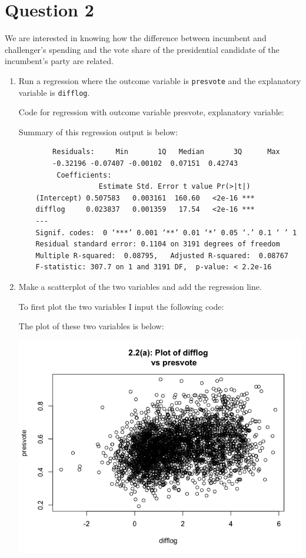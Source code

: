 \documentclass[12pt,letterpaper]{article}
\begin{document}
\newpage

\section*{Question 2}
\noindent We are interested in knowing how the difference between incumbent and challenger's spending and the vote share of the presidential candidate of the incumbent's party are related.	\vspace{.25cm}
	\begin{enumerate}
		\item Run a regression where the outcome variable is \texttt{presvote} and the explanatory variable is \texttt{difflog}.
		
		Code for regression with outcome variable presvote, explanatory variable:
		
		Summary of this regression output is below:
		
			\begin{verbatim}
		Residuals:     Min       1Q   Median       3Q      Max 
		-0.32196 -0.07407 -0.00102  0.07151  0.42743
		 Coefficients:  
		           Estimate Std. Error t value Pr(>|t|)
    (Intercept) 0.507583   0.003161  160.60   <2e-16 ***
    difflog     0.023837   0.001359   17.54   <2e-16 ***
    ---
    Signif. codes:  0 ‘***’ 0.001 ‘**’ 0.01 ‘*’ 0.05 ‘.’ 0.1 ‘ ’ 1
    Residual standard error: 0.1104 on 3191 degrees of freedom
    Multiple R-squared:  0.08795,	Adjusted R-squared:  0.08767 
    F-statistic: 307.7 on 1 and 3191 DF,  p-value: < 2.2e-16
		\end{verbatim} 
		
			\vspace{2cm}
		\item Make a scatterplot of the two variables and add the regression line. 
		
To first plot the two variables I input the following code:
	
	
The plot of these two variables is below:

	\begin{center}	
		\includegraphics[scale=.80]{Plot2.2(a).png}		\end{center}
	

\end{enumerate}
\end{document}
